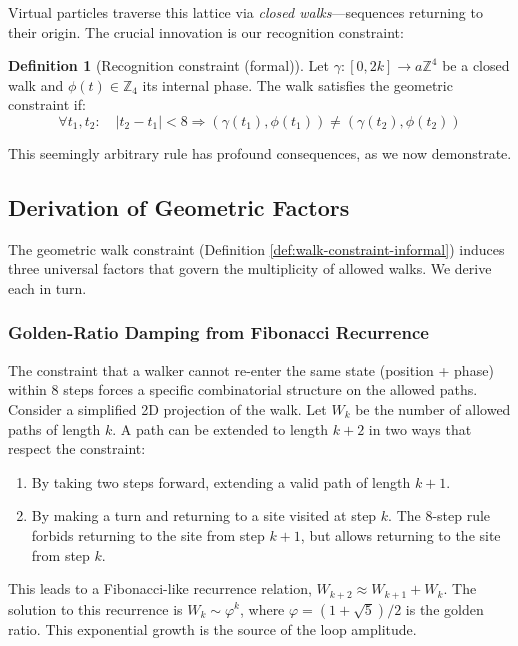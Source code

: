 \documentclass[11pt,a4paper]{article}
\theoremstyle{definition}
\newtheorem{definition}[theorem]{Definition}
\theoremstyle{remark}
\begin{document}
Virtual particles traverse this lattice via \emph{closed walks}—sequences returning to their origin. The crucial innovation is our recognition constraint:

\begin{definition}[Recognition constraint (formal)]
\label{def:recognition-formal}
Let $\gamma: [0,2k] \to a\mathbb{Z}^4$ be a closed walk and $\phi(t) \in \mathbb{Z}_4$ its internal phase. The walk satisfies the geometric constraint if:
\[
\forall t_1, t_2: \quad |t_2 - t_1| < 8 \Rightarrow (\gamma(t_1), \phi(t_1)) \neq (\gamma(t_2), \phi(t_2))
\]
\end{definition}

This seemingly arbitrary rule has profound consequences, as we now demonstrate.

\subsection{Derivation of Geometric Factors}

The geometric walk constraint (Definition \ref{def:walk-constraint-informal}) induces three universal factors that govern the multiplicity of allowed walks. We derive each in turn.

\subsubsection{Golden-Ratio Damping from Fibonacci Recurrence}

The constraint that a walker cannot re-enter the same state (position + phase) within 8 steps forces a specific combinatorial structure on the allowed paths. Consider a simplified 2D projection of the walk. Let $W_k$ be the number of allowed paths of length $k$. A path can be extended to length $k+2$ in two ways that respect the constraint:
\begin{enumerate}
    \item By taking two steps forward, extending a valid path of length $k+1$.
    \item By making a turn and returning to a site visited at step $k$. The 8-step rule forbids returning to the site from step $k+1$, but allows returning to the site from step $k$.
\end{enumerate}
This leads to a Fibonacci-like recurrence relation, $W_{k+2} \approx W_{k+1} + W_k$. The solution to this recurrence is $W_k \sim \varphi^k$, where $\varphi = (1+\sqrt{5})/2$ is the golden ratio. This exponential growth is the source of the loop amplitude.
\end{document}
